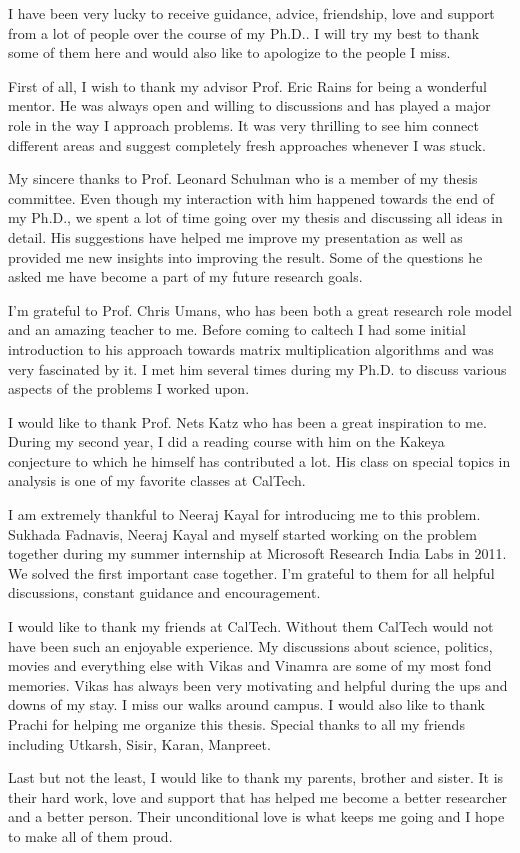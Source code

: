 \documentclass[12pt]{caltech_thesis}
\theoremstyle{plain}
\theoremstyle{definition}
\begin{document}
\begin{acknowledgements} 	 
I have been very lucky to receive guidance, advice, friendship, love and support from a lot of people over the course of my Ph.D..
I will try my best to thank some of them here and would also like to apologize to the people I miss.  

First of all, I wish to thank my advisor Prof. Eric Rains for being a wonderful mentor. He was always open and willing to discussions and
has played a major role in the way I approach problems. It was very thrilling to see him connect different areas and suggest
completely fresh approaches whenever I was stuck. 

My sincere thanks to Prof. Leonard Schulman who is a member of my thesis committee. Even though my interaction with him happened towards
the end of my Ph.D., we spent a lot of time going over my thesis and discussing all ideas in detail. His suggestions have helped me
improve my presentation as well as provided me new insights into improving the result. Some of the questions he asked me have become a part of my future 
research goals. 

I'm grateful to Prof. Chris Umans, who has been both a great research role model and an amazing teacher to me. 
Before coming to caltech I had some initial introduction to his approach towards matrix multiplication 
algorithms and was very fascinated by it.  I met him
several times during my Ph.D. to discuss various aspects of the problems I worked upon. 

I would like to thank Prof. Nets Katz who has been a great inspiration to me. During my second year, I did a reading course
with him on the Kakeya conjecture to which he himself has contributed a lot. His class on special topics in analysis is one of 
my favorite classes at CalTech. 

I am extremely thankful to Neeraj Kayal for introducing me to this problem.
Sukhada Fadnavis, Neeraj Kayal and myself started working on the problem
together during my summer internship at Microsoft Research India Labs in 2011.
We solved the first important case together. I'm grateful to them for all
helpful discussions, constant guidance and encouragement.

I would like to thank my friends at CalTech. Without them CalTech would not have been such an enjoyable experience. My discussions
about science, politics, movies and everything else with Vikas and Vinamra are some of my most fond memories. Vikas has always been 
very motivating and helpful during the ups and downs of my stay. I miss our walks around campus. I would also like to
thank Prachi for helping me organize this thesis. Special thanks to all my friends including 
Utkarsh, Sisir, Karan, Manpreet.

Last but not the least, I would like to thank my parents, brother and sister. It is their hard work, love and support that has helped me 
become a better researcher and a better person. Their unconditional love is what keeps me going and I hope to make all of them proud.





\end{acknowledgements}
\end{document}
